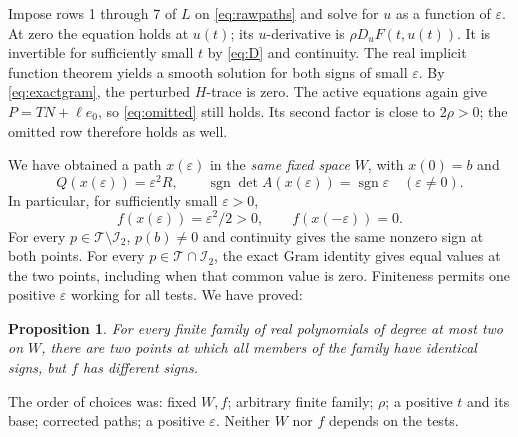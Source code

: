 \documentclass[11pt]{article}
\newtheorem{proposition}[theorem]{Proposition}
\newcommand{\sgn}{\operatorname{sgn}}
\newcommand{\Ical}{\mathcal I_2}
\begin{document}
Impose rows 1 through 7 of $L$ on \eqref{eq:rawpaths} and solve for $u$
as a function of $\varepsilon$. At zero the equation holds at $u(t)$;
its $u$-derivative is $\rho D_uF(t,u(t))$. It is invertible for
sufficiently small $t$ by \eqref{eq:D} and continuity. The real implicit
function theorem yields a smooth solution for both signs of small
$\varepsilon$. By \eqref{eq:exactgram}, the perturbed $H$-trace is zero.
The active equations again give $P=TN+\ell e_0$, so
\eqref{eq:omitted} still holds. Its second factor is close to $2\rho>0$;
the omitted row therefore holds as well.

We have obtained a path $x(\varepsilon)$ in the \emph{same fixed space}
$W$, with $x(0)=b$ and
\begin{equation}\label{eq:finalpaths}
 Q(x(\varepsilon))=\varepsilon^2R,\qquad
 \sgn\det A(x(\varepsilon))=\sgn\varepsilon\quad(\varepsilon\ne0).
\end{equation}
In particular, for sufficiently small $\varepsilon>0$,
\begin{equation}\label{eq:values}
 f(x(\varepsilon))=\varepsilon^2/2>0,\qquad f(x(-\varepsilon))=0.
\end{equation}
For every $p\in\mathcal T\setminus\Ical$, $p(b)\ne0$ and continuity
gives the same nonzero sign at both points. For every $p\in\mathcal T
\cap\Ical$, the exact Gram identity gives equal values at the two
points, including when that common value is zero. Finiteness permits
one positive $\varepsilon$ working for all tests. We have proved:

\begin{proposition}\label{prop:signs}
For every finite family of real polynomials of degree at most two on $W$,
there are two points at which all members of the family have identical
signs, but $f$ has different signs.
\end{proposition}
The order of choices was: fixed $W,f$; arbitrary finite family;
$\rho$; a positive $t$ and its base; corrected paths; a positive
$\varepsilon$. Neither $W$ nor $f$ depends on the tests.
\end{document}
